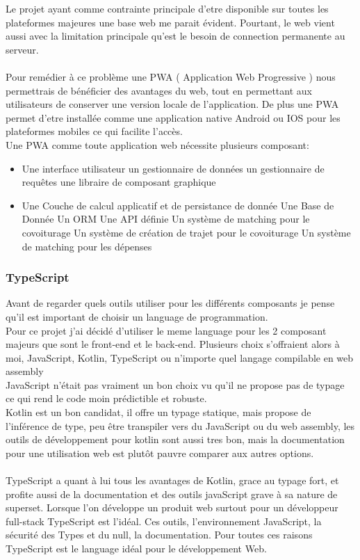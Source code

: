 
Le projet ayant comme contrainte principale d'etre disponible sur toutes les plateformes majeures une base web me parait évident.
Pourtant, le web vient aussi avec la limitation principale qu'est le besoin de connection permanente au serveur.\\\\
Pour remédier à ce problème une PWA ( Application Web Progressive ) nous permettrais de bénéficier des avantages du web,
tout en permettant aux utilisateurs de conserver une version locale de l'application.
De plus une PWA permet d'etre installée comme une application native Android ou IOS pour les plateformes mobiles ce qui facilite l'accès.\\

Une PWA comme toute application web nécessite plusieurs composant:
\begin{itemize}
    \item Une interface utilisateur
    \subitem un gestionnaire de données
    \subitem un gestionnaire de requêtes
    \subitem une libraire de composant graphique
    \item Une Couche de calcul applicatif et de persistance de donnée
    \subitem Une Base de Donnée
    \subitem Un ORM
    \subitem Une API définie
    \subitem Un système de matching pour le covoiturage
    \subitem Un système de création de trajet pour le covoiturage
    \subitem Un système de matching pour les dépenses
\end{itemize}
\subsubsection{TypeScript}
Avant de regarder quels outils utiliser pour les différents composants je pense qu'il est important de choisir un language de programmation.\\
Pour ce projet j'ai décidé d'utiliser le meme language pour les 2 composant majeurs que sont le front-end et le back-end.
Plusieurs choix s'offraient alors à moi, JavaScript, Kotlin, TypeScript ou n'importe quel langage compilable en web assembly\\
JavaScript n'était pas vraiment un bon choix vu qu'il ne propose pas de typage ce qui rend le code moin prédictible et robuste.\\
Kotlin est un bon candidat, il offre un typage statique, mais propose de l'inférence de type, peu être transpiler vers du JavaScript ou du web assembly,
les outils de développement pour kotlin sont aussi tres bon, mais la documentation pour une utilisation web est plutôt pauvre comparer aux autres options.\\\\
TypeScript a quant à lui tous les avantages de Kotlin, grace au typage fort, et profite aussi de la documentation et des outils javaScript grave à sa nature de superset.
Lorsque l'on développe un produit web surtout pour un développeur full-stack TypeScript est l'idéal.
Ces outils, l'environnement JavaScript, la sécurité des Types et du null, la documentation.
Pour toutes ces raisons TypeScript est le language idéal pour le développement Web.

